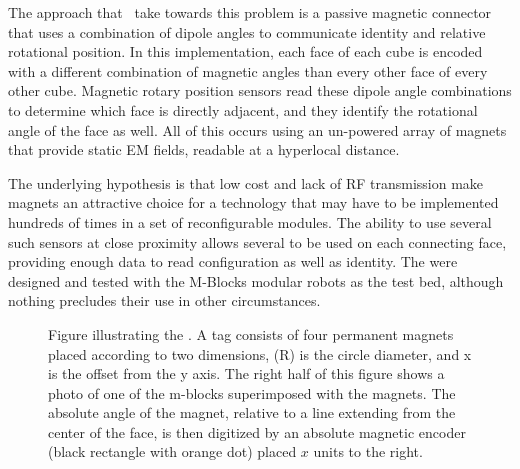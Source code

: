 The approach that \tagNamePlural~take towards this problem is a passive magnetic connector that uses a combination of dipole angles to communicate identity and relative rotational position. In this implementation, each face of each cube is encoded with a different combination of magnetic angles than every other face of every other cube. Magnetic rotary position sensors read these dipole angle combinations to determine which face is directly adjacent, and they identify the rotational angle of the face as well. All of this occurs using an un-powered array of magnets that provide static EM fields, readable at a hyperlocal distance.

The underlying hypothesis is that low cost and lack of RF transmission make magnets an attractive choice for a technology that may have to be implemented hundreds of times in a set of reconfigurable modules. The ability to use several such sensors at close proximity allows several to be used on each connecting face, providing enough data to read configuration as well as identity. The \tagNamePlural were designed and tested with the M-Blocks modular robots as the test bed, although nothing precludes their use in other circumstances.

\begin{figure*}[th]
	
	
	
	\caption{Figure illustrating the \TagNamePlural. A tag consists of four permanent magnets placed according to two dimensions, (R) is the circle diameter, and x is the offset from the y axis. The right half of this figure shows a photo of one of the m-blocks superimposed with the magnets. The absolute angle of the magnet, relative to a line extending from the center of the face, is then digitized by an absolute magnetic encoder (black rectangle with orange dot) placed $x$ units to the right. }
	\label{fig:tagDiagram}
\end{figure*}

